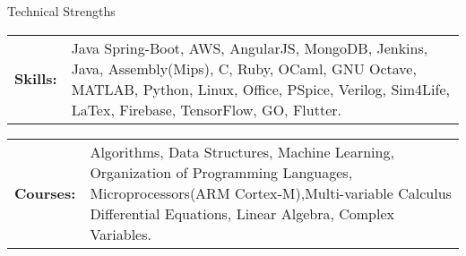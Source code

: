 \documentclass{resume} %
\begin{document}
\begin{rSection}{\small Technical Strengths}

\small %

\small %
\begin{tabular}{p{1.2cm}p{17cm}}
  \textbf{Skills:} &Java Spring-Boot, AWS, AngularJS, MongoDB, Jenkins, Java, Assembly(Mips), C, Ruby, OCaml, GNU Octave, MATLAB, Python, Linux, Office, PSpice, Verilog, Sim4Life, LaTex, Firebase, TensorFlow, GO, Flutter. \\
\end{tabular}
\begin{tabular}{p{1.2cm}p{17cm}}
	\textbf{Courses:} & Algorithms, Data Structures, Machine Learning, Organization of Programming Languages, Microprocessors(ARM Cortex-M),Multi-variable Calculus Differential Equations, Linear Algebra, Complex Variables. \\
\end{tabular}


\end{rSection}
\end{document}
